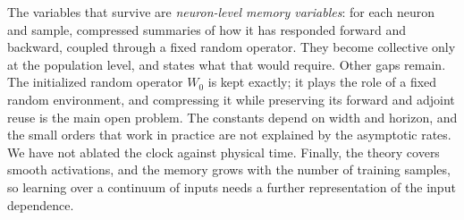 \documentclass[11pt]{article}
\theoremstyle{definition}
\theoremstyle{remark}
\begin{document}
The variables that survive are \emph{neuron-level memory variables}: for each
neuron and sample, compressed summaries of how it has responded forward and
backward, coupled through a fixed random operator.  They become collective only
at the population level, and  states what that would
require.  Other gaps remain.  The initialized random operator $W_0$ is kept
exactly; it plays the role of a fixed random environment, and compressing it
while preserving its forward and adjoint reuse is the main open problem.  The
constants depend on width and horizon, and the small orders that work in
practice are not explained by the asymptotic rates.  We have not ablated the
clock against physical time.  Finally, the theory covers smooth activations, and
the memory grows with the number of training samples, so learning over a
continuum of inputs needs a further representation of the input dependence.
\end{document}
